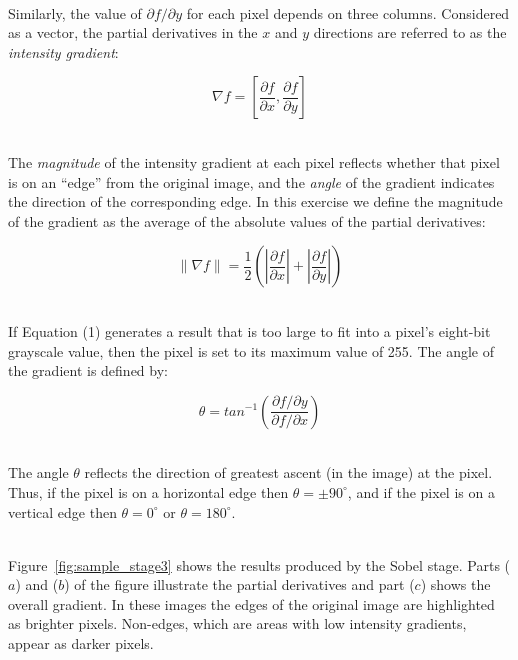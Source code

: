 \documentclass[epsfig,10pt,fullpage]{article}
\begin{document}
~\\
\noindent
Similarly, the value of ${\partial{f}}/{\partial{y}}$ for each pixel depends on three
columns. Considered as a vector, the partial derivatives in the $x$ and $y$ directions
are referred to as the {\it intensity gradient}:

$$\nabla{f}=\left[\frac{\partial{f}}{\partial{x}},\frac{\partial{f}}{\partial{y}}\right]$$

~\\
\noindent
The {\it magnitude} of the intensity gradient at each pixel reflects whether that pixel is on an
``edge'' from the original image, and the {\it angle} of the gradient indicates the
direction of the corresponding edge. In this exercise we define the magnitude of the
gradient as the average of the absolute values of the partial derivatives: 

\begin{equation}
    \|\nabla{f}\|=\frac{1}{2}\left(\left|\frac{\partial{f}}{\partial{x}}\right|+\left|\frac{\partial{f}}{\partial{y}}\right|\right)
\end{equation}

~\\
\noindent
If Equation (1) generates a result that is too large to fit into a pixel's eight-bit grayscale
value, then the pixel is set to its maximum value of 255. The angle of the gradient is
defined by:

\begin{equation}
    \theta={tan}^{-1}\left(\frac{{\partial{f}}/{\partial{y}}}{{\partial{f}}/{\partial{x}}}\right)
\end{equation}

~\\
\noindent
The angle $\theta$ reflects the direction of greatest ascent (in the image) at the pixel. Thus,
if the pixel is on a horizontal edge then $\theta=\pm {90}^\circ$, and if the pixel is on a 
vertical edge then $\theta = 0^\circ$ or $\theta = {180}^\circ$.

~\\
\noindent
Figure~\ref{fig:sample_stage3} shows the results produced by the Sobel stage.
Parts ($a$) and ($b$) of the figure illustrate the partial derivatives and part ($c$)
shows the overall gradient. In these images the edges of the original image are highlighted 
as brighter pixels. Non-edges, which are areas with low intensity gradients, appear as 
darker pixels.
\end{document}
